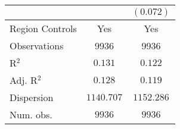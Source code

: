 \begin{center}
\begin{tiny}
\begin{longtable}{l@{} c@{} c@{}}
                                                                            &                  & $(0.072)$        \\
\hline
Region Controls                                                             & Yes              & Yes              \\
Observations                                                                & 9936             & 9936             \\
R$^2$                                                                       & $0.131$          & $0.122$          \\
Adj. R$^2$                                                                  & $0.128$          & $0.119$          \\
Dispersion                                                                  & $1140.707$       & $1152.286$       \\
Num. obs.                                                                   & $9936$           & $9936$           \\
\end{longtable}
\end{tiny}
\end{center}

